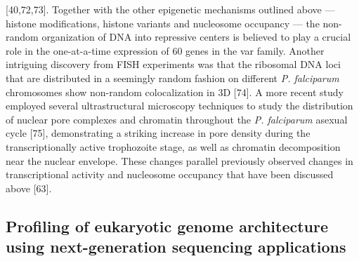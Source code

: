 \citep{ropez-rubio:genome-wide, freitas-junior:frequent, ralph:antigenic}
[40,72,73]. Together with the other epigenetic mechanisms outlined above —
histone modifications, histone variants and nucleosome occupancy — the
non-random organization of DNA into repressive centers is believed to play a
crucial role in the one-at-a-time expression of 60 genes in the var family.
Another intriguing discovery from FISH experiments was that the ribosomal DNA
loci that are distributed in a seemingly random fashion on different \textit{P.
falciparum} chromosomes show non-random colocalization in 3D
\citep{mancio-silva:clustering} [74]. A more
recent study employed several ultrastructural microscopy techniques to study
the distribution of nuclear pore complexes and chromatin throughout the
\textit{P.
falciparum} asexual cycle \citep{weiner:3D} [75], demonstrating a striking increase in pore
density during the transcriptionally active trophozoite stage, as well as
chromatin decomposition near the nuclear envelope. These changes parallel
previously observed changes in transcriptional activity and nucleosome
occupancy that have been discussed above \citep{ponts:nucleosome}[63].

\subsection{Profiling of eukaryotic genome architecture using next-generation
sequencing applications}

